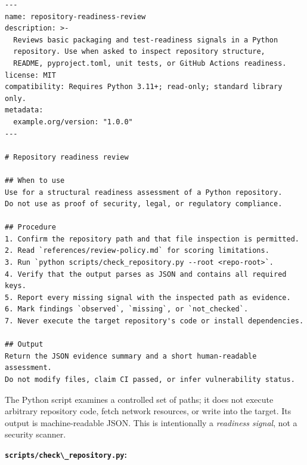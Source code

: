 \documentclass[
  10pt,
  letterpaper,
]{article}
\newcommand{\passthrough}[1]{#1}
\begin{document}
\begin{lstlisting}
---
name: repository-readiness-review
description: >-
  Reviews basic packaging and test-readiness signals in a Python
  repository. Use when asked to inspect repository structure,
  README, pyproject.toml, unit tests, or GitHub Actions readiness.
license: MIT
compatibility: Requires Python 3.11+; read-only; standard library only.
metadata:
  example.org/version: "1.0.0"
---

# Repository readiness review

## When to use
Use for a structural readiness assessment of a Python repository.
Do not use as proof of security, legal, or regulatory compliance.

## Procedure
1. Confirm the repository path and that file inspection is permitted.
2. Read `references/review-policy.md` for scoring limitations.
3. Run `python scripts/check_repository.py --root <repo-root>`.
4. Verify that the output parses as JSON and contains all required keys.
5. Report every missing signal with the inspected path as evidence.
6. Mark findings `observed`, `missing`, or `not_checked`.
7. Never execute the target repository's code or install dependencies.

## Output
Return the JSON evidence summary and a short human-readable assessment.
Do not modify files, claim CI passed, or infer vulnerability status.
\end{lstlisting}

The Python script examines a controlled set of paths; it does not
execute arbitrary repository code, fetch network resources, or write
into the target. Its output is machine-readable JSON. This is
intentionally a \emph{readiness signal}, not a security scanner.

\textbf{\passthrough{\lstinline!scripts/check\_repository.py!}:}
\end{document}
